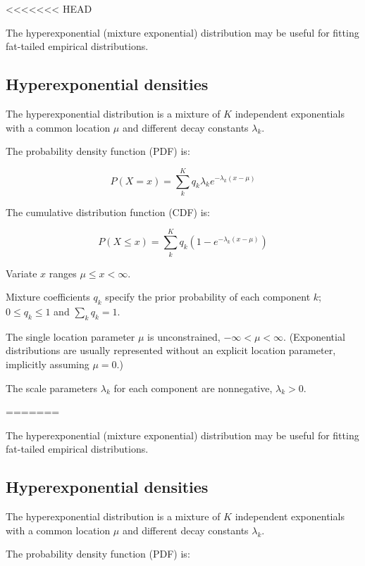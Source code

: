 <<<<<<< HEAD

The hyperexponential (mixture exponential) distribution may be useful
for fitting fat-tailed empirical distributions. 

\subsection{Hyperexponential densities}

The hyperexponential distribution is a mixture of $K$ independent
exponentials with a common location $\mu$ and different decay
constants $\lambda_k$.

The probability density function (PDF) is:

\begin{equation}
P(X=x) = \sum_k^{K} q_k \lambda_k e^{- \lambda_k (x - \mu)}
\label{eqn:hyperexp_pdf}
\end{equation}

The cumulative distribution function (CDF) is:

\begin{equation}
P(X \leq x) = \sum_k^{K} q_k (1 - e^{- \lambda_k (x - \mu)})
\label{eqn:hyperexp_cdf}
\end{equation}

Variate $x$ ranges $\mu \leq x < \infty$.

Mixture coefficients $q_k$ specify the prior probability of each
component $k$; $0 \leq q_k \leq 1$ and $\sum_k q_k = 1$.

The single location parameter $\mu$ is unconstrained, $-\infty < \mu <
\infty$. (Exponential distributions are usually represented without an
explicit location parameter, implicitly assuming $\mu = 0$.)

The scale parameters $\lambda_k$ for each component are nonnegative,
$\lambda_k > 0$.


=======

The hyperexponential (mixture exponential) distribution may be useful
for fitting fat-tailed empirical distributions. 

\subsection{Hyperexponential densities}

The hyperexponential distribution is a mixture of $K$ independent
exponentials with a common location $\mu$ and different decay
constants $\lambda_k$.

The probability density function (PDF) is:

